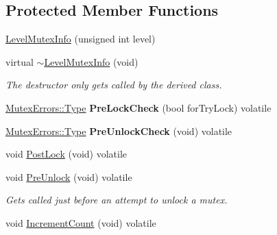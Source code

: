 \subsection*{Protected Member Functions}
\begin{DoxyCompactItemize}
\item 
\hyperlink{classLoki_1_1LevelMutexInfo_a0e7b01d7e0aad6710f34de9811a88151}{Level\+Mutex\+Info} (unsigned int level)
\item 
\hypertarget{classLoki_1_1LevelMutexInfo_a5d6713a7bc49313e970c91cfeb208d0e}{}virtual \hyperlink{classLoki_1_1LevelMutexInfo_a5d6713a7bc49313e970c91cfeb208d0e}{$\sim$\+Level\+Mutex\+Info} (void)\label{classLoki_1_1LevelMutexInfo_a5d6713a7bc49313e970c91cfeb208d0e}

\begin{DoxyCompactList}\small\item\em The destructor only gets called by the derived class. \end{DoxyCompactList}\item 
\hypertarget{classLoki_1_1LevelMutexInfo_a648ffd0040be4464e342d45e8d029972}{}\hyperlink{classLoki_1_1MutexErrors_acd0eb6065ca303083d2e0229d7bff590}{Mutex\+Errors\+::\+Type} {\bfseries Pre\+Lock\+Check} (bool for\+Try\+Lock) volatile\label{classLoki_1_1LevelMutexInfo_a648ffd0040be4464e342d45e8d029972}

\item 
\hypertarget{classLoki_1_1LevelMutexInfo_adc21f5357f74a3b137dded520e35e489}{}\hyperlink{classLoki_1_1MutexErrors_acd0eb6065ca303083d2e0229d7bff590}{Mutex\+Errors\+::\+Type} {\bfseries Pre\+Unlock\+Check} (void) volatile\label{classLoki_1_1LevelMutexInfo_adc21f5357f74a3b137dded520e35e489}

\item 
void \hyperlink{classLoki_1_1LevelMutexInfo_a3fe2ecf1bcf2c49eae04c493f023099c}{Post\+Lock} (void) volatile
\item 
\hypertarget{classLoki_1_1LevelMutexInfo_a7d5e2ace54e9423866be7c76116423df}{}void \hyperlink{classLoki_1_1LevelMutexInfo_a7d5e2ace54e9423866be7c76116423df}{Pre\+Unlock} (void) volatile\label{classLoki_1_1LevelMutexInfo_a7d5e2ace54e9423866be7c76116423df}

\begin{DoxyCompactList}\small\item\em Gets called just before an attempt to unlock a mutex. \end{DoxyCompactList}\item 
\hypertarget{classLoki_1_1LevelMutexInfo_ab31292dd7d1a944b8db2ba39a8487f3b}{}void \hyperlink{classLoki_1_1LevelMutexInfo_ab31292dd7d1a944b8db2ba39a8487f3b}{Increment\+Count} (void) volatile\label{classLoki_1_1LevelMutexInfo_ab31292dd7d1a944b8db2ba39a8487f3b}


\end{DoxyCompactItemize}
